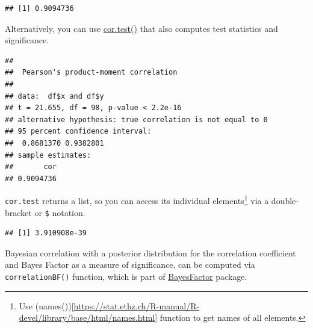 \documentclass[
]{book}
\newenvironment{Shaded}{\begin{snugshade}}{\end{snugshade}}
\newcommand{\AttributeTok}[1]{\textcolor[rgb]{0.77,0.63,0.00}{#1}}
\newcommand{\FunctionTok}[1]{\textcolor[rgb]{0.00,0.00,0.00}{#1}}
\newcommand{\NormalTok}[1]{#1}
\newcommand{\OtherTok}[1]{\textcolor[rgb]{0.56,0.35,0.01}{#1}}
\newcommand{\SpecialCharTok}[1]{\textcolor[rgb]{0.00,0.00,0.00}{#1}}
\newcommand{\StringTok}[1]{\textcolor[rgb]{0.31,0.60,0.02}{#1}}
\begin{document}
\begin{verbatim}
## [1] 0.9094736
\end{verbatim}

Alternatively, you can use \href{https://stat.ethz.ch/R-manual/R-devel/library/stats/html/cor.test.html}{cor.test()} that also computes test statistics and significance.

\begin{Shaded}
\end{Shaded}

\begin{verbatim}
## 
##  Pearson's product-moment correlation
## 
## data:  df$x and df$y
## t = 21.655, df = 98, p-value < 2.2e-16
## alternative hypothesis: true correlation is not equal to 0
## 95 percent confidence interval:
##  0.8681370 0.9382801
## sample estimates:
##       cor 
## 0.9094736
\end{verbatim}

\texttt{cor.test} returns a list, so you can access its individual elements\footnote{Use (names()){[}\url{https://stat.ethz.ch/R-manual/R-devel/library/base/html/names.html}{]} function to get names of all elements.} via a double-bracket or \texttt{\$} notation.

\begin{Shaded}
\end{Shaded}

\begin{verbatim}
## [1] 3.910908e-39
\end{verbatim}

Bayesian correlation with a posterior distribution for the correlation coefficient and Bayes Factor as a measure of significance, can be computed via \texttt{correlationBF()} function, which is part of \href{https://richarddmorey.github.io/BayesFactor}{BayesFactor} package.

\begin{Shaded}
\end{Shaded}
\end{document}
